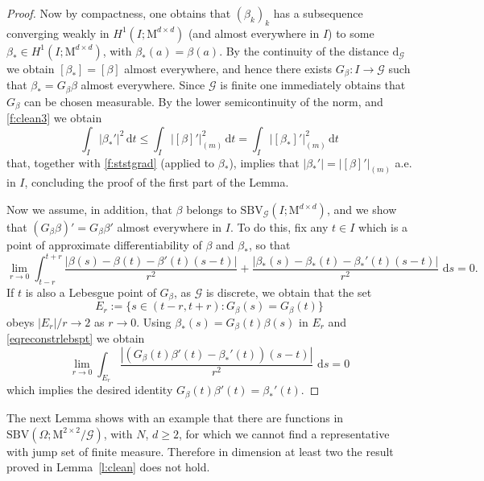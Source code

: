\documentclass[a4paper,reqno]{amsart}
\newcommand{\SBV}{\mathrm{SBV}}
\newcommand{\SBVG}{\mathrm{SBV}_{\mathcal{G}}}
\newcommand{\dG}{\mathrm{d}_{\G}}
\newcommand\dt{{\,\mathrm{d}t}}
\theoremstyle{remark}
\newcommand\ds{{\,\mathrm{d}s}}
\newcommand{\G}{\mathcal{G}}
\newcommand{\Mno}{\mathrm{M}^{d\times d}}
\newcommand{\Mdue}{\mathrm{M}^{2\times 2}}
\numberwithin{equation}{section}
\begin{document}
\begin{proof}
	Now
	by compactness, one obtains that $(\beta_k)_k$ has a subsequence converging weakly in $H^1(I; \mathrm{M}^{d\times d})$ (and almost everywhere in $I$) to some 
$\beta_*\in H^1(I;\mathrm{M}^{d\times d})$, with $\beta_*(a)=\beta(a)$. By the continuity of the distance $\dG$ we obtain $[\beta_*]=[\beta]$ almost everywhere, and hence there exists $G_\beta: I\to \G$ such that $\beta_*=G_\beta\beta$ almost everywhere. Since $\G$ is finite one immediately obtains that $G_\beta$ can be chosen measurable. By the lower semicontinuity of the norm, and \eqref{f:clean3} we obtain
	\[
	\int_I |\beta_*'|^2 \dt \leq \int_I | [\beta]'|_{(m)}^2\dt= \int_I | [\beta_*]'|_{(m)}^2\dt 
	\] 
that, together with \eqref{f:ststgrad} (applied to $\beta_*$), implies that $|\beta_*'|=|[\beta]'|_{(m)}$ a.e. in $I$, concluding the proof of the first part of the Lemma.
	
	Now we assume, in addition, that $\beta$ belongs to $\SBVG(I;\Mno)$, and we show that $(G_\beta\beta)'=G_\beta \beta'$ almost everywhere in $I$. 
	To do this, fix any $t\in I$ which is a point of approximate differentiability of $\beta$ and $\beta_*$,  
	so that
	\begin{equation}\label{eqreconstrlebspt}
		\lim_{r\to0} \int_{t-r}^{t+r}
		\frac{|\beta(s)-\beta(t)-\beta'(t)(s-t)|}{r^2}
		+\frac{|\beta_*(s)-\beta_*(t)-\beta_*'(t)(s-t)|}{r^2}
		\, \ds=0.
	\end{equation}
	If $t$ is also a Lebesgue point of $G_\beta$, as $\G$ is discrete, we obtain that the set 
	\[
	E_r:=\{s\in (t-r,t+r): G_\beta(s)= G_\beta(t)\}
	\] 
	obeys $|E_r|/r\to2$ as $r\to0$. 
Using $\beta_*(s)=G_\beta(t)\beta(s)$ in $E_r$ and \eqref{eqreconstrlebspt} we obtain
	\begin{equation*}
\lim_{r\to0} \int_{E_r}
\frac{|(G_\beta(t)\beta'(t)-\beta_*'(t))(s-t)|}{r^2} \, \ds
=0
	\end{equation*}
	which implies  the desired identity
	$G_\beta(t)\beta'(t)=\beta_*'(t)$.
\end{proof}

The next Lemma shows with an example that
there are functions in
$\SBV(\Omega;\Mdue/\G)$, with $N$, $d\ge2$,
for which we cannot find
a representative with jump set of finite measure. Therefore in dimension at least two the result proved in Lemma~\ref{l:clean} does not hold.
\end{document}
